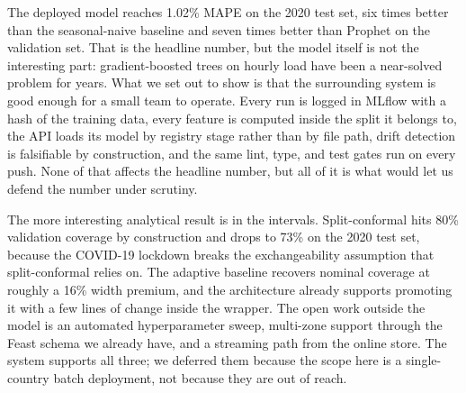 \documentclass[11pt,a4paper]{article}
\begin{document}
The deployed model reaches 1.02\% MAPE on the 2020 test set, six times better than the seasonal-naive baseline and seven times better than Prophet on the validation set. That is the headline number, but the model itself is not the interesting part: gradient-boosted trees on hourly load have been a near-solved problem for years. What we set out to show is that the surrounding system is good enough for a small team to operate. Every run is logged in MLflow with a hash of the training data, every feature is computed inside the split it belongs to, the API loads its model by registry stage rather than by file path, drift detection is falsifiable by construction, and the same lint, type, and test gates run on every push. None of that affects the headline number, but all of it is what would let us defend the number under scrutiny.

The more interesting analytical result is in the intervals. Split-conformal hits 80\% validation coverage by construction and drops to 73\% on the 2020 test set, because the COVID-19 lockdown breaks the exchangeability assumption that split-conformal relies on. The adaptive baseline recovers nominal coverage at roughly a 16\% width premium, and the architecture already supports promoting it with a few lines of change inside the wrapper. The open work outside the model is an automated hyperparameter sweep, multi-zone support through the Feast schema we already have, and a streaming path from the online store. The system supports all three; we deferred them because the scope here is a single-country batch deployment, not because they are out of reach.
\end{document}
